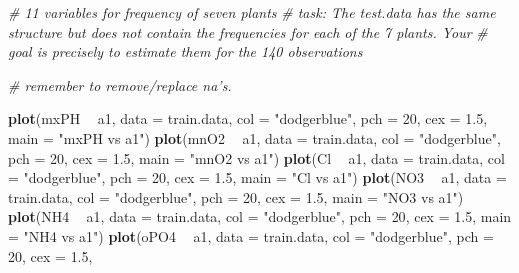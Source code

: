 \documentclass[]{report}
\newenvironment{Shaded}{\begin{snugshade}}{\end{snugshade}}
\newcommand{\KeywordTok}[1]{\textcolor[rgb]{0.13,0.29,0.53}{\textbf{#1}}}
\newcommand{\DataTypeTok}[1]{\textcolor[rgb]{0.13,0.29,0.53}{#1}}
\newcommand{\DecValTok}[1]{\textcolor[rgb]{0.00,0.00,0.81}{#1}}
\newcommand{\FloatTok}[1]{\textcolor[rgb]{0.00,0.00,0.81}{#1}}
\newcommand{\StringTok}[1]{\textcolor[rgb]{0.31,0.60,0.02}{#1}}
\newcommand{\CommentTok}[1]{\textcolor[rgb]{0.56,0.35,0.01}{\textit{#1}}}
\newcommand{\OperatorTok}[1]{\textcolor[rgb]{0.81,0.36,0.00}{\textbf{#1}}}
\newcommand{\NormalTok}[1]{#1}
\begin{document}
\begin{Shaded}
\begin{Highlighting}[]
\CommentTok{# 11 variables for frequency of seven plants}
\CommentTok{# task: The test.data has the same structure but does not contain the frequencies for each of the 7 plants. Your}
\CommentTok{# goal is precisely to estimate them for the 140 observations}

\CommentTok{# remember to remove/replace na's.}
\end{Highlighting}
\end{Shaded}

\begin{Shaded}
\begin{Highlighting}[]
\KeywordTok{plot}\NormalTok{(mxPH }\OperatorTok{~}\StringTok{ }\NormalTok{a1, }\DataTypeTok{data =}\NormalTok{ train.data, }\DataTypeTok{col =} \StringTok{"dodgerblue"}\NormalTok{, }\DataTypeTok{pch =} \DecValTok{20}\NormalTok{, }\DataTypeTok{cex =} \FloatTok{1.5}\NormalTok{,}
     \DataTypeTok{main =} \StringTok{"mxPH vs a1"}\NormalTok{)}
\KeywordTok{plot}\NormalTok{(mnO2 }\OperatorTok{~}\StringTok{ }\NormalTok{a1, }\DataTypeTok{data =}\NormalTok{ train.data, }\DataTypeTok{col =} \StringTok{"dodgerblue"}\NormalTok{, }\DataTypeTok{pch =} \DecValTok{20}\NormalTok{, }\DataTypeTok{cex =} \FloatTok{1.5}\NormalTok{,}
     \DataTypeTok{main =} \StringTok{"mnO2 vs a1"}\NormalTok{)}
\KeywordTok{plot}\NormalTok{(Cl }\OperatorTok{~}\StringTok{ }\NormalTok{a1, }\DataTypeTok{data =}\NormalTok{ train.data, }\DataTypeTok{col =} \StringTok{"dodgerblue"}\NormalTok{, }\DataTypeTok{pch =} \DecValTok{20}\NormalTok{, }\DataTypeTok{cex =} \FloatTok{1.5}\NormalTok{,}
     \DataTypeTok{main =} \StringTok{"Cl vs a1"}\NormalTok{)}
\KeywordTok{plot}\NormalTok{(NO3 }\OperatorTok{~}\StringTok{ }\NormalTok{a1, }\DataTypeTok{data =}\NormalTok{ train.data, }\DataTypeTok{col =} \StringTok{"dodgerblue"}\NormalTok{, }\DataTypeTok{pch =} \DecValTok{20}\NormalTok{, }\DataTypeTok{cex =} \FloatTok{1.5}\NormalTok{,}
     \DataTypeTok{main =} \StringTok{"NO3 vs a1"}\NormalTok{)}
\KeywordTok{plot}\NormalTok{(NH4 }\OperatorTok{~}\StringTok{ }\NormalTok{a1, }\DataTypeTok{data =}\NormalTok{ train.data, }\DataTypeTok{col =} \StringTok{"dodgerblue"}\NormalTok{, }\DataTypeTok{pch =} \DecValTok{20}\NormalTok{, }\DataTypeTok{cex =} \FloatTok{1.5}\NormalTok{,}
     \DataTypeTok{main =} \StringTok{"NH4 vs a1"}\NormalTok{)}
\KeywordTok{plot}\NormalTok{(oPO4 }\OperatorTok{~}\StringTok{ }\NormalTok{a1, }\DataTypeTok{data =}\NormalTok{ train.data, }\DataTypeTok{col =} \StringTok{"dodgerblue"}\NormalTok{, }\DataTypeTok{pch =} \DecValTok{20}\NormalTok{, }\DataTypeTok{cex =} \FloatTok{1.5}\NormalTok{,}

\end{Highlighting}
\end{Shaded}
\end{document}
